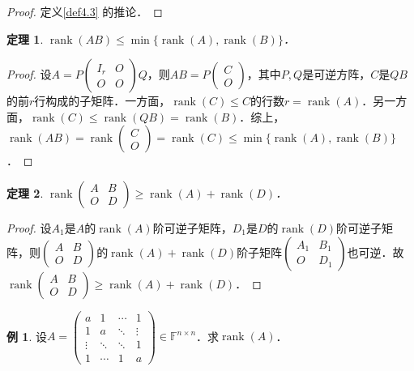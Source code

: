 \documentclass[a4paper,fontset=windows]{ctexbook}
\newtheorem{theorem}{定理}[chapter]
\theoremstyle{definition}
\newtheorem{example}{例}[chapter]
\DeclareMathOperator{\rank}{rank}
\renewcommand{\le}{\leqslant}
\renewcommand{\ge}{\geqslant}
\begin{document}
\begin{proof}
定义\ref{def4.3} 的推论．
\end{proof}

\begin{theorem}\label{thm4.6}
$\rank(AB)\le\min\{\rank(A),\rank(B)\}$．
\end{theorem}

\begin{proof}
设$A=P\begin{pmatrix}I_r&O \\ O&O\end{pmatrix}Q$，则$AB=P\begin{pmatrix}C \\ O\end{pmatrix}$，其中$P,Q$是可逆方阵，$C$是$QB$的前$r$行构成的子矩阵．一方面，$\rank(C)\le C$的行数$r=\rank(A)$．另一方面，$\rank(C)\le\rank(QB)=\rank(B)$．综上，$\rank(AB)=\rank\begin{pmatrix}C \\ O\end{pmatrix}=\rank(C)\le\min\{\rank(A),\rank(B)\}$．
\end{proof}

\begin{theorem}\label{thm4.7}
$\rank\begin{pmatrix}A&B \\ O&D\end{pmatrix}\ge\rank(A)+\rank(D)$．
\end{theorem}

\begin{proof}
设$A_1$是$A$的$\rank(A)$阶可逆子矩阵，$D_1$是$D$的$\rank(D)$阶可逆子矩阵，则$\begin{pmatrix}A&B \\ O&D\end{pmatrix}$的$\rank(A)+\rank(D)$阶子矩阵$\begin{pmatrix}A_1&B_1 \\ O&D_1\end{pmatrix}$也可逆．故$\rank\begin{pmatrix}A&B \\ O&D\end{pmatrix}\ge\rank(A)+\rank(D)$．
\end{proof}

\begin{example}
设$A=\begin{pmatrix}a&1&\cdots&1 \\ 1&a&\ddots&\vdots \\ \vdots&\ddots&\ddots&1 \\ 1&\cdots&1&a\end{pmatrix}\in\mathbb{F}^{n\times n}$．求$\rank(A)$．
\end{example}
\end{document}

